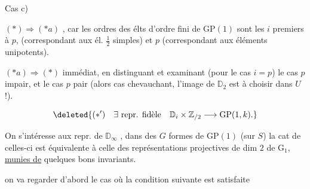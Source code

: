 Cas c)


$(\ast)\Longrightarrow(\ast a)$ , car les ordres des élts d'ordre fini de $\mathrm{GP}(1)$ sont les $i$ premiers à $p$,  (correspondant aux él. $\frac12$ simples) et $p$ (correspondant aux éléments unipotents). 

$(\ast a)\Longrightarrow(\ast)$ immédiat, en distinguant et examinant (pour le cas $i=p$) le cas $p$ impair, et le cas $p$ pair (alors cas chevauchant, l'image de $\mathbb D_2$ est à choisir dans $U$ !).

\[
\deleted{(\ast')\quad\exists\ \text{repr. fidèle}\quad\mathbb D_i\times\mathbb Z_{/2}\longrightarrow\mathrm{GP}(1,k).}
\]




On s'intéresse aux repr. de $\mathbb D_\infty$ , dans des $G$  formes de $\mathrm{GP}(1)$ (sur $S$) \deleted{$\Longleftrightarrow$} la cat de celles-ci est équivalente à celle des représentations  projectives de dim $2$ de $\mathrm G_1$,  \uline{munies de}  quelques bons invariants.

  on va regarder d'abord le cas où la condition suivante est satisfaite

